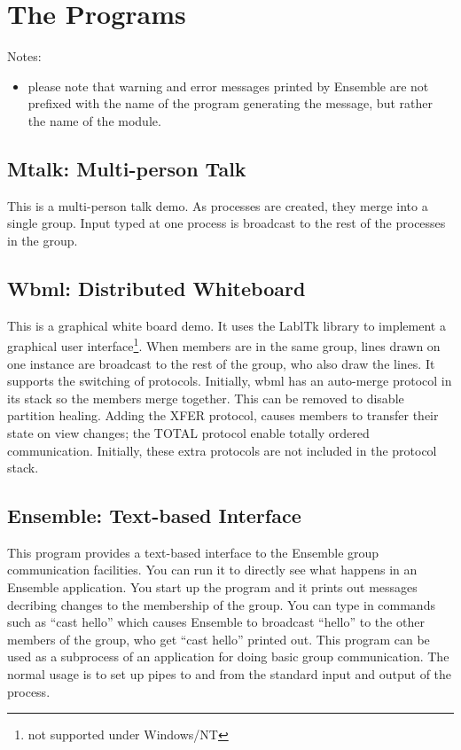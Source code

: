 %
%
%
\section{The Programs}

Notes:
\begin{itemize}
\item
please note that warning and error messages printed by Ensemble are
not prefixed with the name of the program generating the message, but
rather the name of the module.
\end{itemize}

\subsection{Mtalk: Multi-person Talk}
This is a multi-person talk demo.  As  processes are created, they merge
into a single group.  Input typed at one process is broadcast to the rest of the
processes in the group.

\subsection{Wbml: Distributed Whiteboard}
This is a graphical white board demo.  It uses the LablTk library to implement a
graphical user interface\footnote{not supported under Windows/NT}.  When members are
in the same group, lines drawn on one instance are broadcast to the rest of the
group, who also draw the lines.  It supports the switching of protocols.  Initially,
wbml has an auto-merge protocol in its stack so the members merge together.  This can
be removed to disable partition healing.  Adding the XFER protocol, causes members to
transfer their state on view changes; the TOTAL protocol enable totally ordered
communication.  Initially, these extra protocols are not included in the protocol
stack.

\subsection{Ensemble: Text-based Interface}
\label{section:ensemble-demo}
This program provides a text-based interface to the Ensemble group
communication facilities.  You can run it to directly see what happens in an
Ensemble application.  You start up the program and it prints out messages
decribing changes to the membership of the group.  You can type in commands
such as ``cast hello'' which causes Ensemble to broadcast ``hello'' to the
other members of the group, who get ``cast hello'' printed out.  This program
can be used as a subprocess of an application for doing basic group
communication.  The normal usage is to set up pipes to and from the standard
input and output of the  process.

